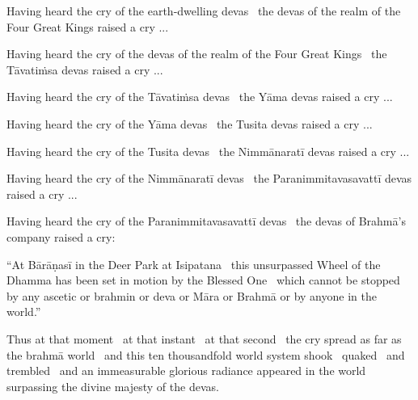 \begin{english-hang}
  Having heard the cry of the earth-dwelling devas \breathmark\ the devas of the realm of the Four Great Kings raised a cry ...
\end{english-hang}

\begin{english-hang}
  Having heard the cry of the devas of the realm of the Four Great Kings \breathmark\ the Tāvatiṁsa devas raised a cry ...
\end{english-hang}

\begin{english-hang}
  Having heard the cry of the Tāvatiṁsa devas \breathmark\ the Yāma devas raised a cry ...
\end{english-hang}

\begin{english-hang}
  Having heard the cry of the Yāma devas \breathmark\ the Tusita devas raised a cry ...
\end{english-hang}

\begin{english-hang}
  Having heard the cry of the Tusita devas \breathmark\ the Nimmānaratī devas raised a cry ...
\end{english-hang}

\begin{english-hang}
  Having heard the cry of the Nimmānaratī devas \breathmark\ the Paranimmitavasavattī devas raised a cry ...
\end{english-hang}

\begin{english-hang}
  Having heard the cry of the Paranimmitavasavattī devas \breathmark\ the devas of Brahmā's company raised a cry:
\end{english-hang}

\begin{english-hang}
  ``At Bārāṇasī in the Deer Park at Isipatana \breathmark\ this unsurpassed Wheel of the Dhamma has been set in motion by the Blessed One \breathmark\ which cannot be stopped by any ascetic or brahmin or deva or Māra or Brahmā or by anyone in the world.''
\end{english-hang}

\begin{english-hang}
  Thus at that moment \breathmark\ at that instant \breathmark\ at that second \breathmark\ the cry spread as far as the brahmā world \breathmark\ and this ten thousandfold world system shook \breathmark\ quaked \breathmark\ and trembled \breathmark\ and an immeasurable glorious radiance appeared in the world surpassing the divine majesty of the devas.
\end{english-hang}

